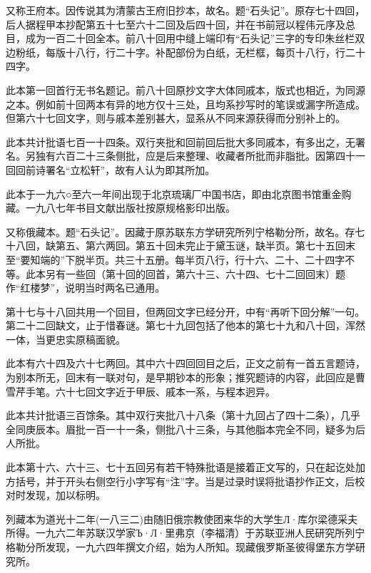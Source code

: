 又称王府本。因传说其为清蒙古王府旧抄本，故名。题``石头记''。原存七十四回，后人据程甲本抄配第五十七至六十二回及后四十回，并在书前冠以程伟元序及总目，成为一百二十回全本。前八十回用中缝上端印有``石头记''三字的专印朱丝栏双边粉纸，每版十八行，行二十字。补配部份为白纸，无栏框，每页十八行，行二十四字。

此本第一回首行无书名题记。前八十回原抄文字大体同戚本，版式也相近，为同源之本。例如前十回两本有异的地方仅十三处，且均系抄写时的笔误或漏字所造成。但第六十七回文字，则与戚本差别甚大，显系从不同来源获得而分别补上的。

此本共计批语七百一十四条。双行夹批和回前回后批大多同戚本，有多出之，无署名。另独有六百二十三条侧批，应是后来整理、收藏者所批而非脂批。因第四十一回回前诗署名``立松轩''，故有人认为即其所加。

此本于一九六○至六一年间出现于北京琉璃厂中国书店，即由北京图书馆重金购藏。一九八七年书目文献出版社按原规格影印出版。

{}

又称俄藏本。题``石头记''。因藏于原苏联东方学研究所列宁格勒分所，故名。存七十八回，缺第五、第六两回。第五十回未完止于黛玉谜，缺半页。第七十五回末至``要知端的''下脱半页。共三十五册。每半页八行，行十六、二十、二十四字不等。此本另有一些回（第十回的回首，第六十三、六十四、七十二回回末）题作``红楼梦''，说明当时两名已通用。

第十七与十八回共用一个回目，但两回文字已经分开，中有``再听下回分解''一句。第二十二回缺文，止于惜春谜。第七十九回包括了他本的第七十九和八十回，浑然一体，当更忠实原稿面貌。

此本有六十四及六十七两回。其中六十四回回目之后，正文之前有一首五言题诗，为别本所无，回末有一联对句，是早期钞本的形象；推究题诗的内容，此回应是曹雪芹手笔。六十七回文字近于甲辰、戚本一系，与程本迥异。

此本共计批语三百馀条。其中双行夹批八十八条（第十九回占了四十二条），几乎全同庚辰本。眉批一百一十一条，侧批八十三条，与其他脂本完全不同，疑多为后人所批。

此本第十六、六十三、七十五回另有若干特殊批语是接着正文写的，只在起讫处加方括号，并于开头右侧空行小字写有``注''字。当是过录时误将批语抄作正文，后校对时发现，加以标明。

列藏本为道光十二年(一八三二)由随旧俄宗教使团来华的大学生Л·库尔梁德采夫所得。一九六二年苏联汉学家Ъ·Л·里弗京（李福清）于苏联亚洲人民研究所列宁格勒分所发现，一九六四年撰文介绍，始为人所知。现藏俄罗斯圣彼得堡东方学研究所。

